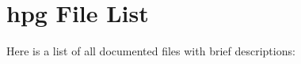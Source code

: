 \section{hpg File List}
Here is a list of all documented files with brief descriptions:\begin{CompactList}
\item{}
\end{CompactList}
